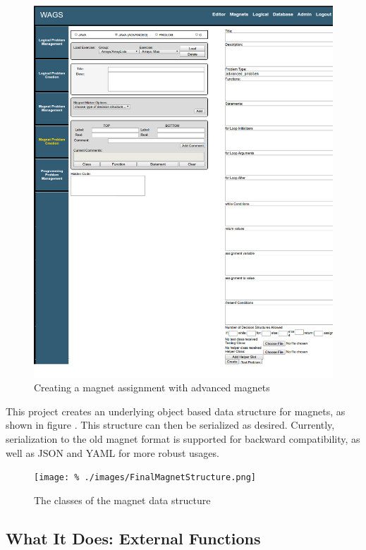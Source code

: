 \documentclass[letter,10pt]{article}
\begin{document}
\begin{figure}[h!]
 \centering
 \includegraphics{./images/wags-adv-magnet-creation.png}
 \caption{Creating a magnet assignment with advanced magnets}
 \label{fig:wags-adv-magnet-creation}
\end{figure}


This project creates an underlying object based data structure for 
magnets, as shown in figure \cite{fig:magnet-diagram}. This structure 
can then be serialized as desired. Currently, serialization to the old 
magnet format is supported for backward compatibility, as well as JSON 
and YAML for more robust usages.

\begin{figure}[h!]
 \centering
 \texttt{[image: \%
./images/FinalMagnetStructure.png]}
 \caption{The classes of the magnet data structure}
 \label{fig:magnet-diagram}
\end{figure}



\subsection{What It Does: External Functions}
\end{document}
